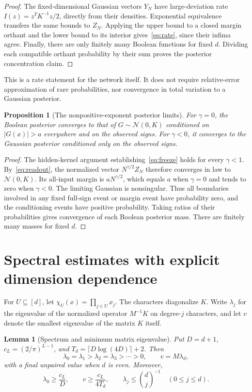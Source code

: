 \documentclass[11pt]{article}
\newtheorem{lemma}[theorem]{Lemma}
\newtheorem{proposition}[theorem]{Proposition}
\theoremstyle{remark}\newtheorem{remark}[theorem]{Remark}
\begin{document}
\begin{proof}
The fixed-dimensional Gaussian vectors $Y_N$ have large-deviation
rate $I(z)=z^TK^{-1}z/2$, directly from their densities. Exponential
equivalence transfers the same bounds to $Z_N$. Applying the upper
bound to a closed margin orthant and the lower bound to its interior
gives~\eqref{eq:rate}, since their infima agree. Finally, there are
only finitely many Boolean functions for fixed $d$. Dividing each
compatible orthant probability by their sum proves the posterior
concentration claim.
\end{proof}

This is a rate statement for the network itself. It does not require
relative-error approximation of rare probabilities, nor convergence
in total variation to a Gaussian posterior.

\begin{proposition}[The nonpositive-exponent posterior limits]
\label{prop:gp-limits}
For $\gamma=0$, the Boolean posterior converges to that of
$G\sim\mathcal N(0,K)$ conditioned on $|G(x)|>a$ everywhere and on
the observed signs. For $\gamma<0$, it converges to the Gaussian
posterior conditioned only on the observed signs.
\end{proposition}
\begin{proof}
The hidden-kernel argument establishing~\eqref{eq:freeze} holds
for every $\gamma<1$. By~\eqref{eq:readout}, the normalized vector
$N^{\gamma/2}Z_N$ therefore converges in law to
$\mathcal N(0,K)$. Its all-input margin is $aN^{\gamma/2}$, which
equals $a$ when $\gamma=0$ and tends to zero when $\gamma<0$.
The limiting Gaussian is nonsingular. Thus all boundaries involved
in any fixed full-sign event or margin event have probability zero,
and the conditioning events have positive probability. Taking
ratios of their probabilities gives convergence of each Boolean
posterior mass. There are finitely many masses for fixed $d$.
\end{proof}

\section{Spectral estimates with explicit dimension dependence}
For $U\subseteq[d]$, let $\chi_U(x)=\prod_{j\in U}x_j$.
The characters diagonalize $K$. Write $\lambda_j$ for the eigenvalue
of the normalized operator $M^{-1}K$ on degree-$j$ characters, and
let $v$ denote the smallest eigenvalue of the matrix $K$ itself.

\begin{lemma}[Spectrum and minimum matrix eigenvalue]
\label{lem:spectrum}
Put $D=d+1$, $c_L=(2/\pi)^{L-1}$, and
$T_d=\lceil D\log(4D)\rceil+2$. Then
\[
 \lambda_0=\lambda_1>\lambda_2=\lambda_3>\cdots>0,
 \qquad v=M\lambda_d,
\]
with a final unpaired value when $d$ is even. Moreover,
\begin{equation}\label{eq:spectralbounds}
 \lambda_0\ge\frac{c_L}{D},\qquad
 v\ge\frac{c_L}{4T_d},\qquad
 \lambda_j\le\binom dj^{-1}\quad(0\le j\le d).
\end{equation}
\end{lemma}
\end{document}
